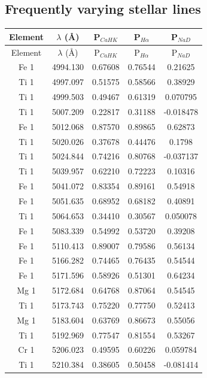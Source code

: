 \subsection{Frequently varying stellar lines}
\begin{longtable}{|c|c|c|c|c|}
    \hline
    Element & $\lambda$ (\AA) & P$_{CaHK}$ & P$_{H\alpha}$ & P$_{NaD}$\\
    \hline
    \endfirsthead
    
    \hline
    Element & $\lambda$ (\AA) & P$_{CaHK}$ & P$_{H\alpha}$ & P$_{NaD}$\\
    \hline
    \endhead
    
    \hline
    \endfoot
    
    \endlastfoot
Fe 1 & 4994.130 & 0.67608 & 0.76544 & 0.21625 \\   
Ti 1 & 4997.097 & 0.51575 & 0.58566 & 0.38929 \\  
Ti 1 & 4999.503 & 0.49467 & 0.61319 & 0.070795 \\ 
Ti 1 & 5007.209 & 0.22817 & 0.31188 & -0.018478 \\
Fe 1 & 5012.068 & 0.87570 & 0.89865 & 0.62873 \\   
Ti 1 & 5020.026 & 0.37678 & 0.44476 & 0.1798 \\   
Ti 1 & 5024.844 & 0.74216 & 0.80768 & -0.037137 \\
Ti 1 & 5039.957 & 0.62210 & 0.72223 & 0.10316 \\   
Fe 1 & 5041.072 & 0.83354 & 0.89161 & 0.54918 \\  
Fe 1 & 5051.635 & 0.68952 & 0.68182 & 0.40891 \\  
Ti 1 & 5064.653 & 0.34410 & 0.30567 & 0.050078 \\  
Fe 1 & 5083.339 & 0.54992 & 0.53720 & 0.39208 \\   
Fe 1 & 5110.413 & 0.89007 & 0.79586 & 0.56134 \\  
Fe 1 & 5166.282 & 0.74465 & 0.76435 & 0.54544 \\  
Fe 1 & 5171.596 & 0.58926 & 0.51301 & 0.64234 \\  
Mg 1 & 5172.684 & 0.64768 & 0.87064 & 0.54545 \\  
Ti 1 & 5173.743 & 0.75220 & 0.77750 & 0.52413 \\    
Mg 1 & 5183.604 & 0.63769 & 0.86673 & 0.55056 \\  
Ti 1 & 5192.969 & 0.77547 & 0.81554 & 0.53267 \\  
Cr 1 & 5206.023 & 0.49595 & 0.60226 & 0.059784 \\ 
Ti 1 & 5210.384 & 0.38605 & 0.50458 & -0.081414 \\

\end{longtable}
